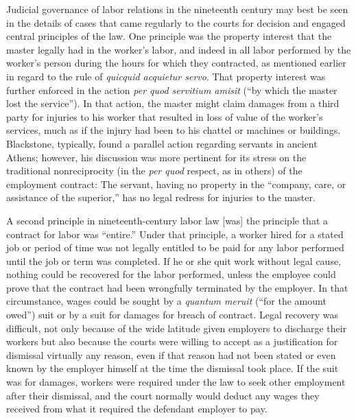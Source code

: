 \documentclass[
  letterpaper,
  11pt,
  DIV=9,
  openright]{scrbook}
\begin{document}
Judicial governance of labor relations in the nineteenth century may
best be seen in the details of cases that came regularly to the courts
for decision and engaged central principles of the law. One principle
was the property interest that the master legally had in the worker's
labor, and indeed in all labor performed by the worker's person during
the hours for which they contracted, as mentioned earlier in regard to
the rule of \emph{quicquid acquietur servo}. That property interest was
further enforced in the action \emph{per quod servitium amisit} (``by
which the master lost the service''). In that action, the master might
claim damages from a third party for injuries to his worker that
resulted in loss of value of the worker's services, much as if the
injury had been to his chattel or machines or buildings. Blackstone,
typically, found a parallel action regarding servants in ancient Athens;
however, his discussion was more pertinent for its stress on the
traditional nonreciprocity (in the \emph{per quod} respect, as in
others) of the employment contract: The servant, having no property in
the ``company, care, or assistance of the superior,'' has no legal
redress for injuries to the master.

A second principle in nineteenth-century labor law {[}was{]} the
principle that a contract for labor was ``entire.'' Under that
principle, a worker hired for a stated job or period of time was not
legally entitled to be paid for any labor performed until the job or
term was completed. If he or she quit work without legal cause, nothing
could be recovered for the labor performed, unless the employee could
prove that the contract had been wrongfully terminated by the employer.
In that circumstance, wages could be sought by a \emph{quantum meruit}
(``for the amount owed'') suit or by a suit for damages for breach of
contract. Legal recovery was difficult, not only because of the wide
latitude given employers to discharge their workers but also because the
courts were willing to accept as a justification for dismissal virtually
any reason, even if that reason had not been stated or even known by the
employer himself at the time the dismissal took place. If the suit was
for damages, workers were required under the law to seek other
employment after their dismissal, and the court normally would deduct
any wages they received from what it required the defendant employer to
pay.
\end{document}

